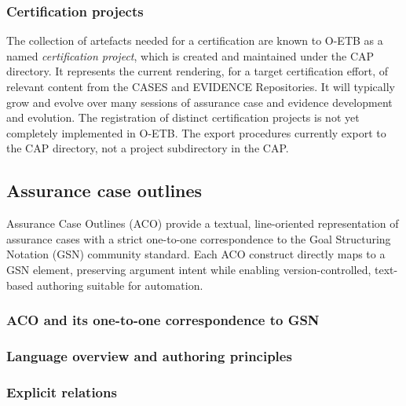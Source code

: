 \documentclass[12pt,twoside,a4paper]{article}
\begin{document}
\hypertarget{certification-projects}{%
\subsubsection{Certification projects}\label{certification-projects}}

The collection of artefacts needed for a certification are known to O-ETB as a named \emph{certification project}, which is created and maintained under the CAP directory. It represents the current rendering, for a target certification effort, of relevant content from the CASES and EVIDENCE Repositories. It will typically grow and evolve over many sessions of assurance case and evidence development and evolution. The registration of distinct certification projects is not yet completely implemented in O-ETB. The export procedures currently export to the CAP directory, not a project subdirectory in the CAP.

\hypertarget{assurance-case-outlines}{%
\subsection{Assurance case outlines}\label{assurance-case-outlines}}

Assurance Case Outlines (ACO) provide a textual, line-oriented representation of assurance cases with a strict one-to-one correspondence to the Goal Structuring Notation (GSN) community standard. Each ACO construct directly maps to a GSN element, preserving argument intent while enabling version-controlled, text-based authoring suitable for automation.

\hypertarget{aco-and-its-one-to-one-correspondence-to-gsn}{%
\subsubsection{ACO and its one-to-one correspondence to GSN}\label{aco-and-its-one-to-one-correspondence-to-gsn}}

\hypertarget{language-overview-and-authoring-principles}{%
\subsubsection{Language overview and authoring principles}\label{language-overview-and-authoring-principles}}

\hypertarget{explicit-relations}{%
\subsubsection{Explicit relations}\label{explicit-relations}}
\end{document}
